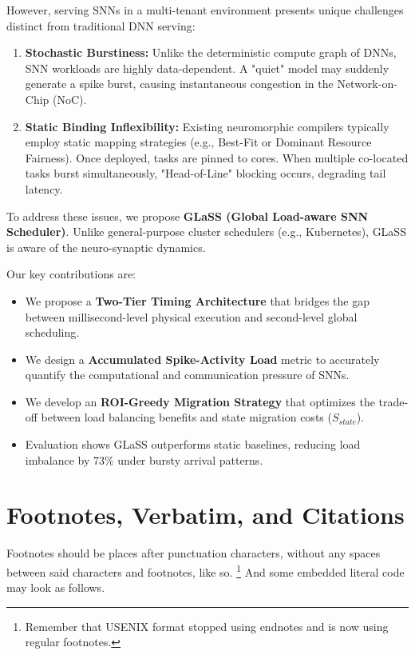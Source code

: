 \documentclass[letterpaper,twocolumn,10pt]{article}
\begin{document}
However, serving SNNs in a multi-tenant environment presents unique challenges distinct from traditional DNN serving:
\begin{enumerate}
    \item \textbf{Stochastic Burstiness:} Unlike the deterministic compute graph of DNNs, SNN workloads are highly data-dependent. A "quiet" model may suddenly generate a spike burst, causing instantaneous congestion in the Network-on-Chip (NoC).
    \item \textbf{Static Binding Inflexibility:} Existing neuromorphic compilers typically employ static mapping strategies (e.g., Best-Fit or Dominant Resource Fairness). Once deployed, tasks are pinned to cores. When multiple co-located tasks burst simultaneously, "Head-of-Line" blocking occurs, degrading tail latency.
\end{enumerate}

To address these issues, we propose \textbf{GLaSS (Global Load-aware SNN Scheduler)}. Unlike general-purpose cluster schedulers (e.g., Kubernetes), GLaSS is aware of the neuro-synaptic dynamics.

Our key contributions are:
\begin{itemize}
    \item We propose a \textbf{Two-Tier Timing Architecture} that bridges the gap between millisecond-level physical execution and second-level global scheduling.
    \item We design a \textbf{Accumulated Spike-Activity Load} metric to accurately quantify the computational and communication pressure of SNNs.
    \item We develop an \textbf{ROI-Greedy Migration Strategy} that optimizes the trade-off between load balancing benefits and state migration costs ($S_{state}$).
    \item Evaluation shows GLaSS outperforms static baselines, reducing load imbalance by 73\% under bursty arrival patterns.
\end{itemize}
\section{Footnotes, Verbatim, and Citations}

Footnotes should be places after punctuation characters, without any
spaces between said characters and footnotes, like so.%
\footnote{Remember that USENIX format stopped using endnotes and is
  now using regular footnotes.} And some embedded literal code may
look as follows.
\end{document}
